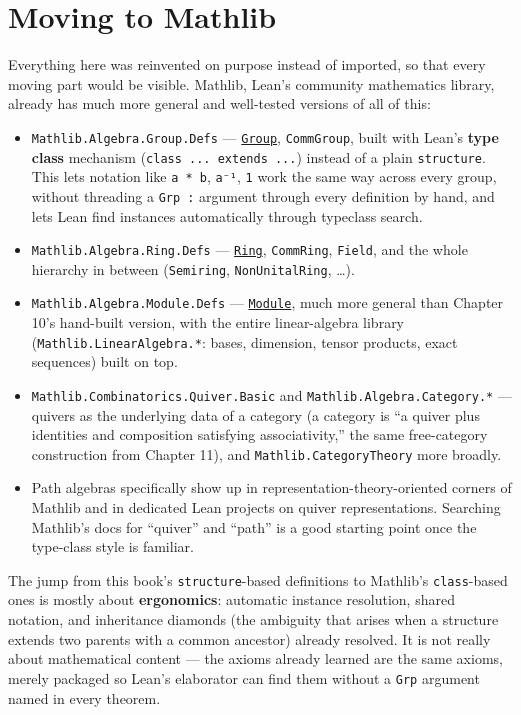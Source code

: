 \section{Moving to Mathlib}\label{sec:13-next-steps:02-moving-to-mathlib:1}

Everything here was reinvented on purpose instead of imported, so that every moving part would be visible. Mathlib, Lean's community mathematics library, already has much more general and well-tested versions of all of this:

\begin{itemize}
\tightlist
\item
  \texttt{Mathlib.Algebra.Group.Defs} --- \href{https://loogle.lean-lang.org/?q=Group}{\texttt{Group}}, \texttt{CommGroup}, built with Lean's \textbf{type class} mechanism (\texttt{class ... extends ...}) instead of a plain \texttt{structure}. This lets notation like \texttt{a * b}, \texttt{a⁻¹}, \texttt{1} work the same way across every group, without threading a \texttt{Grp :} argument through every definition by hand, and lets Lean find instances automatically through typeclass search.
\item
  \texttt{Mathlib.Algebra.Ring.Defs} --- \href{https://loogle.lean-lang.org/?q=Ring}{\texttt{Ring}}, \texttt{CommRing}, \texttt{Field}, and the whole hierarchy in between (\texttt{Semiring}, \texttt{NonUnitalRing}, \ldots).
\item
  \texttt{Mathlib.Algebra.Module.Defs} --- \href{https://loogle.lean-lang.org/?q=Module}{\texttt{Module}}, much more general than Chapter 10's hand-built version, with the entire linear-algebra library (\texttt{Mathlib.LinearAlgebra.*}: bases, dimension, tensor products, exact sequences) built on top.
\item
  \texttt{Mathlib.Combinatorics.Quiver.Basic} and \texttt{Mathlib.Algebra.Category.*} --- quivers as the underlying data of a category (a category is ``a quiver plus identities and composition satisfying associativity,'' the same free-category construction from Chapter 11), and \texttt{Mathlib.CategoryTheory} more broadly.
\item
  Path algebras specifically show up in representation-theory-oriented corners of Mathlib and in dedicated Lean projects on quiver representations. Searching Mathlib's docs for ``quiver'' and ``path'' is a good starting point once the type-class style is familiar.
\end{itemize}

The jump from this book's \texttt{structure}-based definitions to Mathlib's \texttt{class}-based ones is mostly about \textbf{ergonomics}: automatic instance resolution, shared notation, and inheritance diamonds (the ambiguity that arises when a structure extends two parents with a common ancestor) already resolved. It is not really about mathematical content --- the axioms already learned are the same axioms, merely packaged so Lean's elaborator can find them without a \texttt{Grp} argument named in every theorem.

